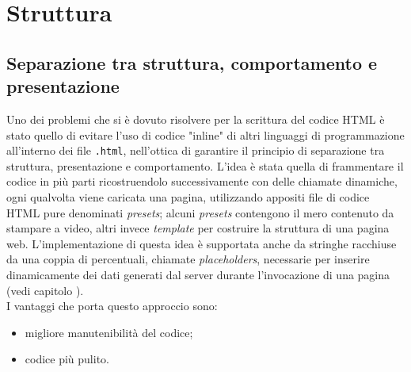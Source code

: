 \section{Struttura}
    \subsection{Separazione tra struttura, comportamento e presentazione}
    Uno dei problemi che si è dovuto risolvere per la scrittura del codice HTML è stato quello di evitare l'uso di codice "inline" di altri linguaggi di programmazione all'interno dei file \texttt{.html}, nell'ottica di  garantire il principio di separazione tra struttura, presentazione e comportamento. L'idea è stata quella di frammentare il codice in più parti ricostruendolo successivamente con delle chiamate dinamiche, ogni qualvolta viene caricata una pagina, utilizzando appositi file di codice HTML pure denominati \textit{presets}; alcuni \textit{presets} contengono il mero contenuto da stampare a video, altri invece \textit{template} per costruire la struttura di una pagina web. L'implementazione di questa idea è supportata anche da stringhe racchiuse da una coppia di percentuali, chiamate \textit{placeholders}, necessarie per inserire dinamicamente dei dati generati dal server durante l'invocazione di una pagina (vedi capitolo ).\\ I vantaggi che porta questo approccio sono:
    \begin{itemize}
        \item migliore manutenibilità del codice;
        \item codice più pulito.
    \end{itemize}
    
